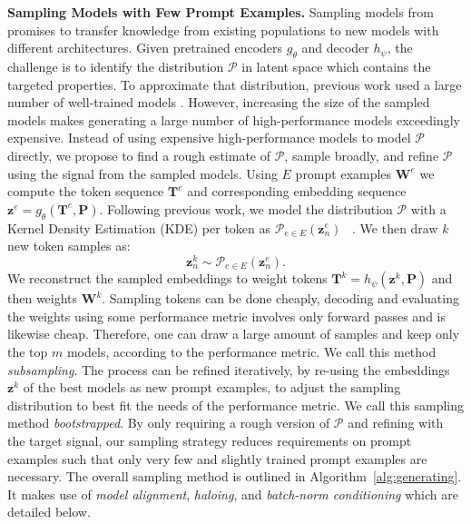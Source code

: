 \textbf{Sampling Models with Few Prompt Examples.}
Sampling models from \ourmethod promises to transfer knowledge from existing populations to new models with different architectures.
Given pretrained encoders $g_{\theta}$ and decoder $h_\psi$, the challenge is to identify the distribution $\mathcal{P}$ in latent space which contains the targeted properties.
To approximate that distribution, previous work used a large number of well-trained models \citep{peeblesLearningLearnGenerative2022,schurholtHyperRepresentationsGenerativeModels2022}.
However, increasing the size of the sampled models makes generating a large number of high-performance models exceedingly expensive.
Instead of using expensive high-performance models to model $\mathcal{P}$ directly, we propose to find a rough estimate of $\mathcal{P}$, sample broadly, and refine $\mathcal{P}$ using the signal from the sampled models.
Using $E$ prompt examples $\mathbf{W}^e$ we compute the token sequence $\mathbf{T}^e$ and corresponding embedding sequence $\mathbf{z}^e = g_{\theta}(\mathbf{T}^e, \mathbf{P})$. Following previous work, we model the distribution $\mathcal{P}$ with a Kernel Density Estimation (KDE) per token as $\mathcal{P}_{e \in E}(\mathbf{z}_n^e)$ ~\citep{schurholtHyperRepresentationsGenerativeModels2022}.
We then draw $k$ new token samples as:
\begin{equation}
    \mathbf{z}_n^k \sim \mathcal{P}_{e \in E}(\mathbf{z}_n^e).
\end{equation}
We reconstruct the sampled embeddings to weight tokens $\mathbf{T}^k = h_{\psi}(\mathbf{z}^k,\mathbf{P})$ and then weights $\mathbf{W}^k$. 
Sampling tokens can be done cheaply, decoding and evaluating the weights using some performance metric involves only forward passes and is likewise cheap. 
Therefore, one can draw a large amount of samples and keep only the top $m$ models, according to the performance metric. 
We call this method \emph{subsampling}.
The process can be refined iteratively, by re-using the embeddings $\mathbf{z}^k$ of the best models as new prompt examples, to adjust the sampling distribution to best fit the needs of the performance metric. 
We call this sampling method \emph{bootstrapped}.
By only requiring a rough version of $\mathcal{P}$ and refining with the target signal, our sampling strategy reduces requirements on prompt examples such that only very few and slightly trained prompt examples are necessary. The overall sampling method is outlined in Algorithm~\ref{alg:generating}. It makes use of \textit{model alignment}, \textit{haloing}, and \textit{batch-norm conditioning} which are detailed below.
